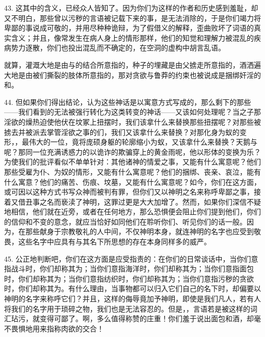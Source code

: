 43. 这其中的含义，已经众人皆知了。因为你们为这样的作者和历史感到羞耻，却又不明白，那些曾以污秽的言语被记载下来的事，是无法消除的，于是你们竭力将卑鄙的事说成可敬的，并用尽种种诡辩，为了假借义的解释，歪曲败坏了词语的真实含义；并且，像常发生在病人身上的情形那样，他们的知觉和理解力被混乱的疾病势力逐散，你们也投出混乱而不确定的，在空洞的虚构中胡言乱语。\par

就算，灌溉大地是由与的结合所意指的，种子的埋藏是由父掳走所意指的，酒洒遍大地是由被们撕裂的肢体所意指的，那对贪欲与鲁莽的约束也被说成是捆绑奸淫的和。\par

44. 但如果你们得出结论，认为这些神话是以寓意方式写成的，那么剩下的那些——我们看到的无法被强行转化为这类转变的神话——又该如何处理呢？当之子那淫欲的燥热迫使他伏在坟冢上扭摆时，我们该拿什么来替换那些扭摆呢？对那些被掳去并被派去掌管淫欲之事的们，我们又该拿什么来替换？对那化身为蚁的变形，，最伟大的一位，竟将庞硕身躯的轮廓缩小为蚁，又该拿什么来替换？天鹅与呢？那同一位充满诱惑力的以诡诈的欺骗穿上的黄金雨呢，他以形体的变换为乐？为使我们的批评看似不单单针对：其他诸神的情爱之事，又能有什么寓意呢？他们那些受雇为仆、为奴的情形，又能有什么寓意呢？他们的捆绑、丧亲、哀泣，能有什么寓意？他们的痛苦、伤痕、坟墓，又能有什么寓意呢？如今，你们在这方面，或可因以这种方式书写众神而被判有罪，但你们又以神明之名来称呼卑鄙之事，接着又借丑事之名而亵渎了神明，这罪过更是大大加增了。然而，如果你们深信不疑地相信，他们就在近旁，或者在任何地方，那么恐惧便会阻止你们提到他们，你们的信仰和不变的意念，就应当恰好如同他们在聆听你们、听见你们的话一般。因为，在那些献身于宗教敬礼的人中间，不仅神明本身，就连神明的名字也应受到敬畏，这些名字中应具有与其名下所思想的存在本身同样多的威严。\par

45. 公正地判断吧，你们在这方面是应受指责的：在你们的日常谈话中，当你们意指战斗时，你们却称其为；当你们意指海洋时，你们却称其为；当你们意指面包时，你们却称其为；当你们意指纺织时，你们却称其为；当你们意指污秽的贪欲时，你们却称其为。有什么理由，当事物都可以归入它们自己的名下时，却偏要以神明的名字来称呼它们？并且，这样的侮辱竟加予神明，即使是我们凡人，若有人将我们的名字用于琐碎之物，我们也是无法容忍的。但是，，言语若是被这样的词汇玷污，就变得可鄙了。啊，多么值得称赞的庄重！你们羞于说出面包和酒，却毫不畏惧地用来指称肉欲的交合！\par

